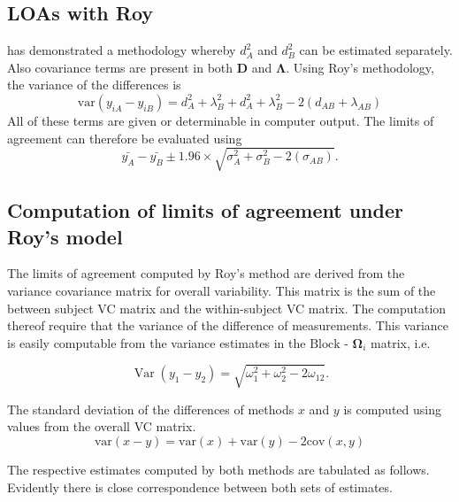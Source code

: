 \documentclass[12pt, a4paper]{report}
\theoremstyle{plain}
\theoremstyle{definition}
\theoremstyle{remark}
\begin{document}
		\subsection{LOAs with Roy}
		
			\citet{ARoy2009} has demonstrated a methodology whereby $d^2_{A}$ and $d^2_{B}$ can be estimated separately. Also covariance terms are present in both $\boldsymbol{D}$ and $\boldsymbol{\Lambda}$. Using Roy's methodology, the variance of the differences is
			\begin{equation}
			\mbox{var} (y_{iA}-y_{iB})= d^2_{A} + \lambda^2_{B} + d^2_{A} + \lambda^2_{B} - 2(d_{AB} + \lambda_{AB})
			\end{equation}
			All of these terms are given or determinable in computer output.
			The limits of agreement can therefore be evaluated using
			\begin{equation}
			\bar{y_{A}}-\bar{y_{B}} \pm 1.96 \times \sqrt{ \sigma^2_{A} + \sigma^2_{B}  - 2(\sigma_{AB})}.
			\end{equation}
\subsection{Computation of limits of agreement under Roy's model}
	The limits of agreement computed by Roy's method are derived from the variance covariance matrix for overall variability.
	This matrix is the sum of the between subject VC matrix and the within-subject VC matrix.
	The computation thereof require that the variance of the difference of measurements. This variance is easily computable from the  variance estimates in the ${\mbox{Block - }\boldsymbol \Omega_{i}}$ matrix, i.e.
	
	
	\[
	\operatorname{Var}(y_1 - y_2) = \sqrt{ \omega^2_1 + \omega^2_2 - 2\omega_{12}}.
	\]
	
	
	
	
	

	
	
	
	The standard deviation of the differences of methods $x$ and $y$ is computed using values from the overall VC matrix.
	\[
	\mbox{var}(x - y ) = \mbox{var} ( x )  + \mbox{var} ( y ) - 2\mbox{cov} ( x ,y )
	\]
	
	
	The respective estimates computed by both methods are tabulated as follows. Evidently there is close correspondence between both sets of estimates.
	
\end{document}
